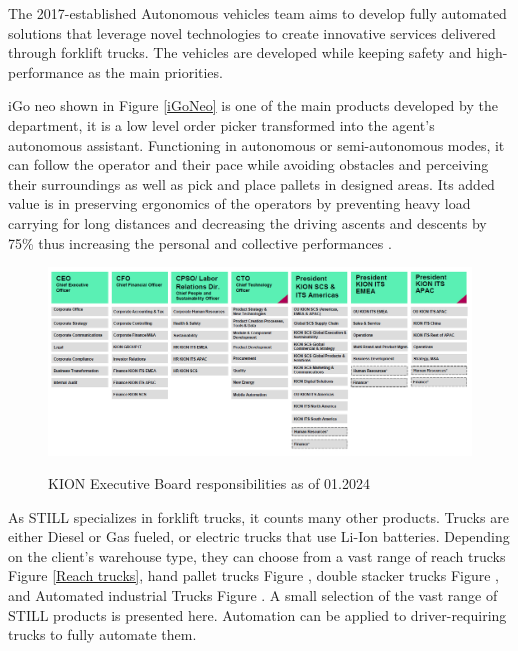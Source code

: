 The 2017-established Autonomous vehicles team aims to develop fully automated solutions that leverage 
novel technologies to create innovative services delivered through forklift trucks. 
The vehicles are developed while keeping safety and high-performance as the main priorities.  

iGo neo shown in Figure \ref{iGoNeo} is one of the main products developed by the department, it is a low level order picker transformed 
into the agent's autonomous assistant. Functioning in autonomous or semi-autonomous modes, it can follow 
the operator and their pace while avoiding obstacles and perceiving their surroundings as well as pick 
and place pallets in designed areas. Its added value is in preserving ergonomics of the operators by 
preventing heavy load carrying for long distances and decreasing the driving ascents and descents by 75\% 
thus increasing the personal and collective performances \cite{R3}.

\begin{figure}[H]
    \begin{center}
    \includegraphics[width=\linewidth]{images/Chap0/KION_Hierarchy.png}\\
    \caption{KION Executive Board responsibilities as of 01.2024 \cite{R2}}
    \label{KION Hierarchy}
    \end{center}
    \end{figure}

As STILL specializes in forklift trucks, it counts many other products. Trucks are either Diesel or 
Gas fueled, or electric trucks that use Li-Ion batteries. Depending on the client's warehouse type, they can
choose from a vast range of reach trucks Figure \ref{Reach trucks}, hand pallet trucks Figure , 
double stacker trucks Figure , and Automated industrial Trucks Figure  \cite{R4}.
A small selection of the vast range of STILL products is presented here. 
Automation can be applied to driver-requiring trucks to fully automate them.


